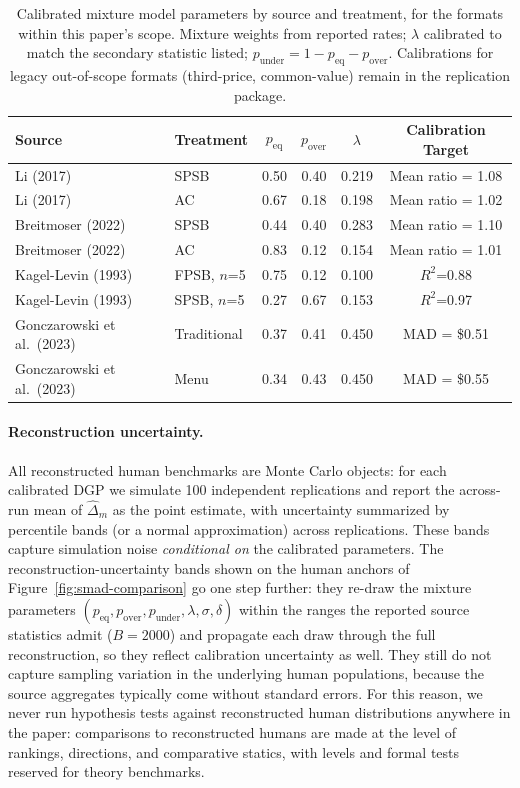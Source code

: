 \begin{table}[h]
\centering
\small
\begin{tabular}{llcccc}
\toprule
Source & Treatment & $p_{\text{eq}}$ & $p_{\text{over}}$ & $\lambda$ & Calibration Target \\
\midrule
Li (2017) & SPSB & 0.50 & 0.40 & 0.219 & Mean ratio = 1.08 \\
Li (2017) & AC & 0.67 & 0.18 & 0.198 & Mean ratio = 1.02 \\
Breitmoser (2022) & SPSB & 0.44 & 0.40 & 0.283 & Mean ratio = 1.10 \\
Breitmoser (2022) & AC & 0.83 & 0.12 & 0.154 & Mean ratio = 1.01 \\
Kagel-Levin (1993) & FPSB, $n$=5 & 0.75 & 0.12 & 0.100 & $R^2$=0.88 \\
Kagel-Levin (1993) & SPSB, $n$=5 & 0.27 & 0.67 & 0.153 & $R^2$=0.97 \\
Gonczarowski et al.\ (2023) & Traditional & 0.37 & 0.41 & 0.450 & MAD = \$0.51 \\
Gonczarowski et al.\ (2023) & Menu & 0.34 & 0.43 & 0.450 & MAD = \$0.55 \\
\bottomrule
\end{tabular}
\caption{Calibrated mixture model parameters by source and treatment, for the formats within this paper's scope. Mixture weights from reported rates; $\lambda$ calibrated to match the secondary statistic listed; $p_{\text{under}} = 1 - p_{\text{eq}} - p_{\text{over}}$. Calibrations for legacy out-of-scope formats (third-price, common-value) remain in the replication package.}
\label{tab:mixture-calibration}
\end{table}

\paragraph{Reconstruction uncertainty.}
All reconstructed human benchmarks are Monte Carlo objects: for each calibrated DGP we simulate 100 independent replications and report the across-run mean of $\widehat{\Delta}_m$ as the point estimate, with uncertainty summarized by percentile bands (or a normal approximation) across replications. These bands capture simulation noise \emph{conditional on} the calibrated parameters. The reconstruction-uncertainty bands shown on the human anchors of Figure~\ref{fig:smad-comparison} go one step further: they re-draw the mixture parameters $(p_{\text{eq}}, p_{\text{over}}, p_{\text{under}}, \lambda, \sigma, \delta)$ within the ranges the reported source statistics admit ($B = 2000$) and propagate each draw through the full reconstruction, so they reflect calibration uncertainty as well. They still do not capture sampling variation in the underlying human populations, because the source aggregates typically come without standard errors. For this reason, we never run hypothesis tests against reconstructed human distributions anywhere in the paper: comparisons to reconstructed humans are made at the level of rankings, directions, and comparative statics, with levels and formal tests reserved for theory benchmarks. 
